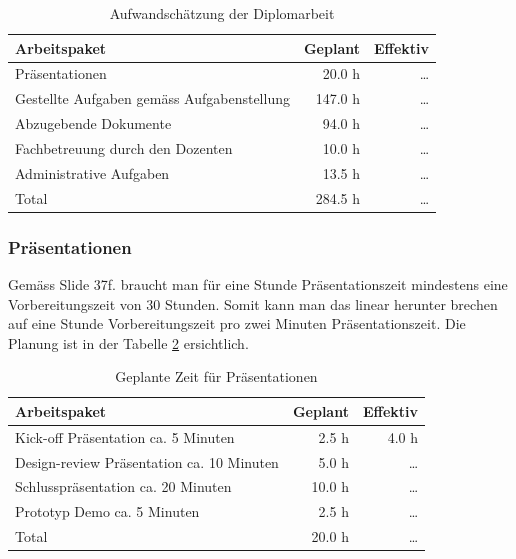   \begin{table}[ht]
    \begin{center}
      \begin{tabular}{p{9cm}rr}
        \toprule
        Arbeitspaket & Geplant & Effektiv \\
        \midrule
        Präsentationen &
        20.0 h &
        \ldots\\
        Gestellte Aufgaben gemäss Aufgabenstellung &
        147.0 h &
        \ldots\\
        Abzugebende Dokumente &
        94.0 h &
        \ldots\\
        Fachbetreuung durch den Dozenten &
        10.0 h &
        \ldots\\
        Administrative Aufgaben &
        13.5 h &
        \ldots\\
        \bottomrule
        Total &
        284.5 h &
        \ldots\\
        \bottomrule
      \end{tabular}
      \caption{Aufwandschätzung der Diplomarbeit}
      \label{tab:planing}
    \end{center}
  \end{table}
  
  \subsubsection{Präsentationen}
  
  Gemäss \cite{KillerPresentation} Slide 37f. braucht man für eine Stunde
  Präsentationszeit mindestens eine Vorbereitungszeit von 30 Stunden. Somit kann
  man das linear herunter brechen auf eine Stunde Vorbereitungszeit pro zwei
  Minuten Präsentationszeit. Die Planung ist in der Tabelle
  \ref{tab:presentationPlaning} ersichtlich.
  \newline
  
  \begin{table}[ht]
    \begin{center}
      \begin{tabular}{p{9cm}rr}
        \toprule
        Arbeitspaket & Geplant & Effektiv \\
        \midrule
        Kick-off Präsentation ca. 5 Minuten &
        2.5 h &
        4.0 h\\
        Design-review Präsentation ca. 10 Minuten &
        5.0 h &
        \ldots\\
        Schlusspräsentation ca. 20 Minuten &
        10.0 h &
        \ldots\\
        Prototyp Demo ca. 5 Minuten &
        2.5 h &
        \ldots\\
        \bottomrule
        Total &
        20.0 h &
        \ldots\\
        \bottomrule
      \end{tabular}
      \caption{Geplante Zeit für Präsentationen}
      \label{tab:presentationPlaning}
    \end{center}
  \end{table}
  
